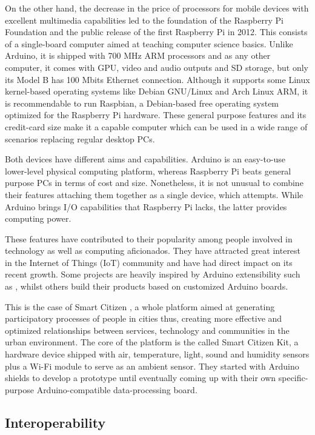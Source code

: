 On the other hand, the decrease in the price of processors for mobile devices with excellent multimedia capabilities led to the foundation of the Raspberry Pi Foundation and the public release of the first Raspberry Pi in 2012. This consists of a single-board computer aimed at teaching computer science basics. Unlike Arduino, it is shipped with 700 MHz ARM processors and as any other computer, it comes with GPU, video and audio outputs and SD storage, but only its Model B has 100 Mbits Ethernet connection. Although it supports some Linux kernel-based operating systems like Debian GNU/Linux and Arch Linux ARM, it is recommendable to run Raspbian, a Debian-based free operating system optimized for the Raspberry Pi hardware. These general purpose features and its credit-card size make it a capable computer which can be used in a wide range of scenarios replacing regular desktop PCs.

Both devices have different aims and capabilities. Arduino is an easy-to-use lower-level physical computing platform, whereas Raspberry Pi beats general purpose PCs in terms of cost and size. Nonetheless, it is not unusual to combine their features attaching them together as a single device, which \cite{Arduberry} attempts. While Arduino brings I/O capabilities that Raspberry Pi lacks, the latter provides computing power.

These features have contributed to their popularity among people involved in technology as well as computing aficionados. They have attracted great interest in the Internet of Things (IoT) community and have had direct impact on its recent growth. Some projects are heavily inspired by Arduino extensibility such as \cite{Thinking-Things}, whilst others build their products based on customized Arduino boards.

This is the case of Smart Citizen \cite{smart-citizen}, a whole platform aimed at generating participatory processes of people in cities thus, creating more effective and optimized relationships between services, technology and communities in the urban environment. The core of the platform is the called Smart Citizen Kit, a hardware device shipped with air, temperature, light, sound and humidity sensors plus a Wi-Fi module to serve as an ambient sensor. They started with Arduino shields to develop a prototype until eventually coming up with their own specific-purpose Arduino-compatible data-processing board.

\subsection{Interoperability} \label{interoperability}

